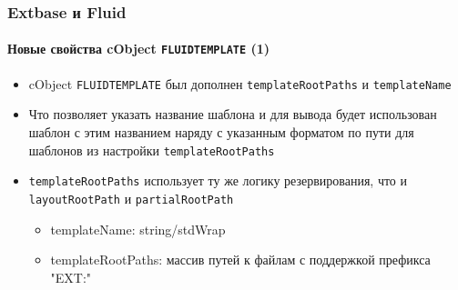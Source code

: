 \begin{frame}[fragile]
	\frametitle{Extbase и Fluid}
	\framesubtitle{Новые свойства cObject \texttt{FLUIDTEMPLATE} (1)}

	\begin{itemize}

		\item cObject \texttt{FLUIDTEMPLATE} был дополнен
			\texttt{templateRootPaths} и \texttt{templateName}

		\item Что позволяет указать название шаблона и для вывода будет использован
			шаблон с этим названием наряду с указанным форматом по пути для шаблонов из настройки
			\texttt{templateRootPaths}

		\item \texttt{templateRootPaths} использует ту же логику резервирования, что и 
			\texttt{layoutRootPath} и \texttt{partialRootPath}

			\begin{itemize}
				\item templateName: string/stdWrap
				\item templateRootPaths: массив путей к файлам с поддержкой префикса "EXT:"
			\end{itemize}

	\end{itemize}

\end{frame}


